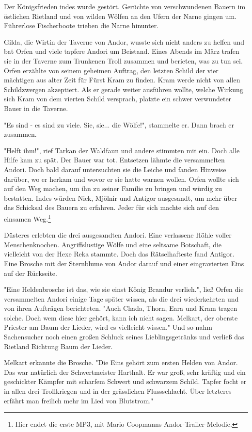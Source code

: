 \documentclass[10pt, a4paper, oneside]{book}
\begin{document}
\begin{multicols}{2}
Der Königsfrieden indes wurde gestört. Gerüchte von verschwundenen Bauern im östlichen Rietland und von wilden Wölfen an den Ufern der Narne gingen um. Führerlose Fischerboote trieben die Narne hinunter.

Gilda, die Wirtin der Taverne von Andor, wusste sich nicht anders zu helfen und bat Orfen und viele tapfere Andori um Beistand. Eines Abends im März trafen sie in der Taverne zum Trunkenen Troll zusammen und berieten, was zu tun sei. Orfen erzählte von seinem geheimen Auftrag, den letzten Schild der vier mächtigen aus alter Zeit für Fürst Kram zu finden. Kram werde nicht von allen Schildzwergen akzeptiert. Als er gerade weiter ausführen wollte, welche Wirkung sich Kram von dem vierten Schild versprach, platzte ein schwer verwundeter Bauer in die Taverne. 

"Es sind - es sind zu viele. Sie, sie... die Wölfe!", stammelte er. Dann brach er zusammen.

"Helft ihm!", rief Tarkan der Waldfaun und andere stimmten mit ein. Doch alle Hilfe kam zu spät. Der Bauer war tot. Entsetzen lähmte die versammelten Andori. Doch bald darauf untersuchten sie die Leiche und fanden Hinweise darüber, wo er herkam und wovor er sie hatte warnen wollen. Orfen wollte sich auf den Weg machen, um ihn zu seiner Familie zu bringen und würdig zu bestatten. Indes würden Nick, Mjölnir und Antigor ausgesandt, um mehr über das Schicksal des Bauern zu erfahren. Jeder für sich machte sich auf den einsamen Weg.\footnote{Hier endet die erste MP3, mit Mario Coopmanns Andor-Trailer-Melodie.}\bigskip

Düsteres erlebten die drei ausgesandten Andori. Eine verlassene Höhle voller Menschenknochen. Angriffslustige Wölfe und eine seltsame Botschaft, die vielleicht von der Hexe Reka stammte. Doch das Rätselhafteste fand Antigor. Eine Brosche mit der Sternblume von Andor darauf und einer eingravierten Eins auf der Rückseite.

"Eine Heldenbrosche ist das, wie sie einst König Brandur verlieh.", ließ Orfen die versammelten Andori einige Tage später wissen, als die drei wiederkehrten und von ihren Aufträgen berichteten. "Auch Chada, Thorn, Eara und Kram tragen solche. Doch wem diese hier gehört, kann ich nicht sagen. Melkart, der oberste Priester am Baum der Lieder, wird es vielleicht wissen." Und so nahm Sachensucher noch einen großen Schluck seines Lieblingsgetränks und verließ das Rietland Richtung Baum der Lieder.

Melkart erkannte die Brosche. "Die Eins gehört zum ersten Helden von Andor. Das war natürlich der Schwertmeister Harthalt. Er war groß, sehr kräftig und ein geschickter Kämpfer mit scharfem Schwert und schwarzem Schild. Tapfer focht er in allen drei Trollkriegen und in der grässlichen Flussschlacht. Über letzteres erfährt man freilich mehr im Lied von Blutstrom."


\end{multicols}
\end{document}
